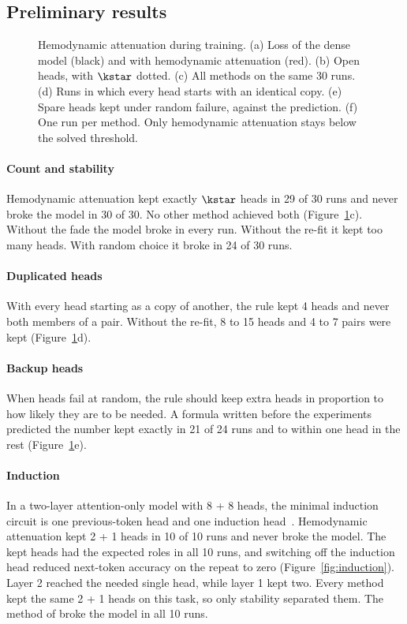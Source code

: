 \subsection{Preliminary results}

\begin{figure}[htbtp]
\centering
{}
\caption[Hemodynamic attenuation during training]{Hemodynamic attenuation during training.
(a) Loss of the dense model (black) and with hemodynamic attenuation (red).
(b) Open heads, with $\kstar$ dotted.
(c) All methods on the same 30 runs.
(d) Runs in which every head starts with an identical copy.
(e) Spare heads kept under random failure, against the prediction.
(f) One run per method. Only hemodynamic attenuation stays below the solved threshold.}
\label{fig:main}
\end{figure}

\paragraph{Count and stability}
Hemodynamic attenuation kept exactly $\kstar$ heads in 29 of 30 runs and never broke the model in 30 of 30. No other method achieved both (Figure~\ref{fig:main}c). Without the fade the model broke in every run. Without the re-fit it kept too many heads. With random choice it broke in 24 of 30 runs.

\paragraph{Duplicated heads}
With every head starting as a copy of another, the rule kept 4 heads and never both members of a pair. Without the re-fit, 8 to 15 heads and 4 to 7 pairs were kept (Figure~\ref{fig:main}d).

\paragraph{Backup heads}
When heads fail at random, the rule should keep extra heads in proportion to how likely they are to be needed. A formula written before the experiments predicted the number kept exactly in 21 of 24 runs and to within one head in the rest (Figure~\ref{fig:main}e).

\paragraph{Induction}
In a two-layer attention-only model with 8 + 8 heads, the minimal induction circuit is one previous-token head and one induction head~\citep{olsson2022}. Hemodynamic attenuation kept 2 + 1 heads in 10 of 10 runs and never broke the model. The kept heads had the expected roles in all 10 runs, and switching off the induction head reduced next-token accuracy on the repeat to zero (Figure~\ref{fig:induction}). Layer 2 reached the needed single head, while layer 1 kept two. Every method kept the same 2 + 1 heads on this task, so only stability separated them. The method of \citet{michel2019sixteen} broke the model in all 10 runs.

